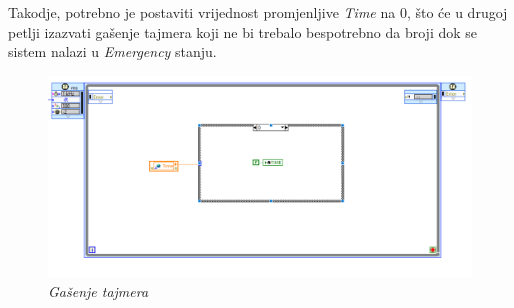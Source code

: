 \documentclass[12pt, titlepage]{article}
\begin{document}
                Takodje, potrebno je postaviti vrijednost promjenljive \textit{Time} na $0$,
                što će u drugoj petlji izazvati gašenje tajmera koji ne bi trebalo bespotrebno da broji 
                dok se sistem nalazi u \textit{Emergency} stanju.

                \begin{figure}[ht]
                    \centering
                    \includegraphics[width=\textwidth]{Slike/HAND_AUTO.vi TIME FALSE.png}
                    \caption{\textit{Gašenje tajmera}}
                \end{figure}
                
\end{document}
